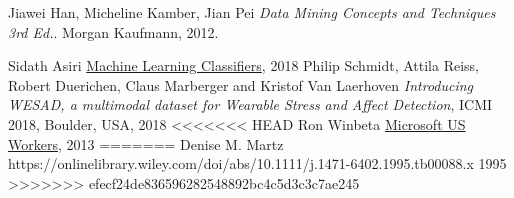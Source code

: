 \newpage

\begin{thebibliography}{9}
	Jiawei Han, Micheline Kamber, Jian Pei
	\textit{Data Mining Concepts and Techniques 3rd Ed.}. 
	Morgan Kaufmann, 2012.

	Sidath Asiri
	\href{https://towardsdatascience.com/machine-learning-classifiers-a5cc4e1b0623}{Machine Learning Classifiers},
	2018
	Philip Schmidt, Attila Reiss, Robert Duerichen, Claus Marberger and Kristof Van Laerhoven
	\textit{Introducing WESAD, a multimodal dataset for Wearable Stress and Affect Detection}, 
	ICMI 2018, Boulder, USA, 2018
<<<<<<< HEAD
	Ron Winbeta
	\href{https://www.onmsft.com/news/microsoft-us-workers-spend-7-hours-computer-day-average}{Microsoft US Workers},
	2013
=======
\bibitem
	Denise M. Martz
	https://onlinelibrary.wiley.com/doi/abs/10.1111/j.1471-6402.1995.tb00088.x
	1995
>>>>>>> efecf24de836596282548892bc4c5d3c3c7ae245
\end{thebibliography}
